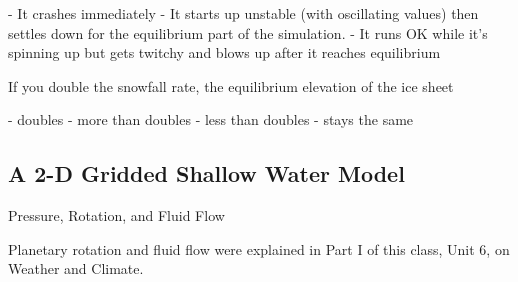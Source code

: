 {- It crashes immediately
- It starts up unstable (with oscillating values) then settles down for the equilibrium part of the simulation.
- It runs OK while it's spinning up but gets twitchy and blows up after it reaches equilibrium

If you double the snowfall rate, the equilibrium elevation of the ice sheet

 - doubles
 - more than doubles
 - less than doubles
 - stays the same

\subsection{A 2-D Gridded Shallow Water Model}
Pressure, Rotation, and Fluid Flow

Planetary rotation and fluid flow were explained in Part I of this class, Unit 6, on Weather and Climate.

}
